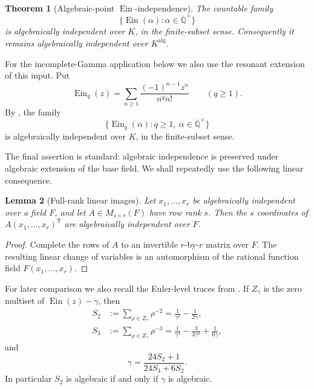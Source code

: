 \documentclass[11pt]{article}
\newtheorem{theorem}{Theorem}[section]
\newtheorem{lemma}[theorem]{Lemma}
\theoremstyle{definition}
\theoremstyle{remark}
\newcommand{\Qbar}{\overline{\mathbb Q}}
\newcommand{\Ein}{\operatorname{Ein}}
\begin{document}
\begin{theorem}[Algebraic-point \(\Ein\)-independence]
\label{thm:input-independence}
The countable family
\[
 \{\Ein(\alpha):\alpha\in\Qbar^\times\}
\]
is algebraically independent over \(K\), in the finite-subset sense.
Consequently it remains algebraically independent over
\(K^{\mathrm{alg}}\).
\end{theorem}

For the incomplete-Gamma application below we also use the resonant
extension of this input.  Put
\[
 \Ein_q(z)=\sum_{n\ge1}\frac{(-1)^{n-1}z^n}{n^q n!}
 \qquad(q\ge1).
\]
By \cite[Thm.~1.4]{KEIO2026I}, the family
\begin{equation}\label{eq:resonant-input}
 \{\Ein_q(\alpha):q\ge1,\ \alpha\in\Qbar^\times\}
\end{equation}
is algebraically independent over \(K\), in the finite-subset sense.

The final assertion is standard: algebraic independence is preserved under
algebraic extension of the base field.  We shall repeatedly use the following
linear consequence.

\begin{lemma}[Full-rank linear images]
\label{lem:linear-images}
Let \(x_1,\ldots,x_r\) be algebraically independent over a field \(F\), and
let \(A\in M_{s\times r}(F)\) have row rank \(s\).  Then the \(s\) coordinates
of \(A(x_1,\ldots,x_r)^{\mathsf T}\) are algebraically independent over \(F\).
\end{lemma}

\begin{proof}
Complete the rows of \(A\) to an invertible \(r\)-by-\(r\) matrix over \(F\).
The resulting linear change of variables is an automorphism of the rational
function field \(F(x_1,\ldots,x_r)\).
\end{proof}

For later comparison we also recall the Euler-level traces from
\cite[Thm.~14.5]{KEIO2026I}.  If \(Z_\gamma\) is the zero multiset of
\(\Ein(z)-\gamma\), then
\begin{align}
 S_2&:=\sum_{\rho\in Z_\gamma}\rho^{-2}
 =\frac1{\gamma^2}-\frac1{2\gamma},\label{eq:S2}\\
 S_3&:=\sum_{\rho\in Z_\gamma}\rho^{-3}
 =\frac1{\gamma^3}-\frac3{4\gamma^2}+\frac1{6\gamma},\label{eq:S3}
\end{align}
and
\begin{equation}\label{eq:gamma-recovery}
 \gamma=\frac{24S_2+1}{24S_3+6S_2}.
\end{equation}
In particular \(S_2\) is algebraic if and only if \(\gamma\) is algebraic.
\end{document}
